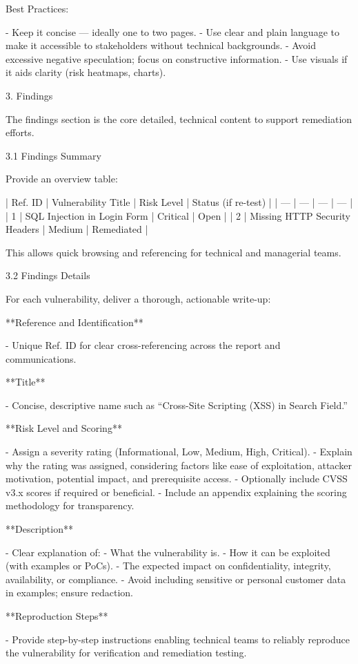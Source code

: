 Best Practices:

- Keep it concise — ideally one to two pages.
- Use clear and plain language to make it accessible to stakeholders without technical backgrounds.
- Avoid excessive negative speculation; focus on constructive information.
- Use visuals if it aids clarity (risk heatmaps, charts).


3. Findings

The findings section is the core detailed, technical content to support remediation efforts.

3.1 Findings Summary

Provide an overview table:

| Ref. ID | Vulnerability Title | Risk Level | Status (if re-test) |
| --- | --- | --- | --- |
| 1 | SQL Injection in Login Form | Critical | Open |
| 2 | Missing HTTP Security Headers | Medium | Remediated |



This allows quick browsing and referencing for technical and managerial teams.


3.2 Findings Details

For each vulnerability, deliver a thorough, actionable write-up:

**Reference and Identification**

- Unique Ref. ID for clear cross-referencing across the report and communications.

**Title**

- Concise, descriptive name such as “Cross-Site Scripting (XSS) in Search Field.”

**Risk Level and Scoring**

- Assign a severity rating (Informational, Low, Medium, High, Critical).
- Explain why the rating was assigned, considering factors like ease of exploitation, attacker motivation, potential impact, and prerequisite access.
- Optionally include CVSS v3.x scores if required or beneficial.
- Include an appendix explaining the scoring methodology for transparency.

**Description**

- Clear explanation of:
    - What the vulnerability is.
    - How it can be exploited (with examples or PoCs).
    - The expected impact on confidentiality, integrity, availability, or compliance.
- Avoid including sensitive or personal customer data in examples; ensure redaction.

**Reproduction Steps**

- Provide step-by-step instructions enabling technical teams to reliably reproduce the vulnerability for verification and remediation testing.

